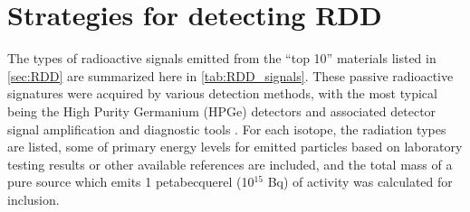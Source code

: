 \documentclass{report}
\begin{document}




\section{Strategies for detecting RDD}
 

The types of radioactive signals emitted from the \enquote{top 10} materials listed in \autoref{sec:RDD} are summarized here in \autoref{tab:RDD_signals}.  These passive radioactive signatures were acquired by various detection methods, with the most typical being the High Purity Germanium (HPGe) detectors and associated detector signal amplification and diagnostic tools \cite{Glaser2007}.  For each isotope, the radiation types are listed, some of primary energy levels for emitted particles based on laboratory testing results or other available references are included, and the total mass of a pure source which emits 1 petabecquerel (10\(^{15}\) Bq) of activity was calculated for inclusion. 
\end{document}
